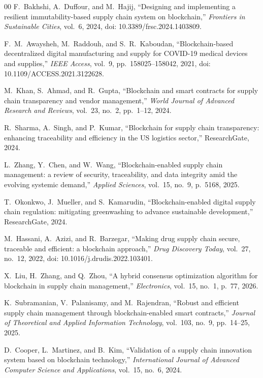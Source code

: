 \documentclass[conference]{IEEEtran}
\begin{document}
\begin{thebibliography}{00}
F.\ Bakhshi, A.\ Duffour, and M.\ Hajij, ``Designing and implementing a resilient immutability-based supply chain system on blockchain,'' \textit{Frontiers in Sustainable Cities}, vol.~6, 2024, doi: 10.3389/frsc.2024.1403809.

F.\ M.\ Awaysheh, M.\ Raddouh, and S.\ R.\ Kaboudan, ``Blockchain-based decentralized digital manufacturing and supply for COVID-19 medical devices and supplies,'' \textit{IEEE Access}, vol.~9, pp.~158025--158042, 2021, doi: 10.1109/ACCESS.2021.3122628.

M.\ Khan, S.\ Ahmad, and R.\ Gupta, ``Blockchain and smart contracts for supply chain transparency and vendor management,'' \textit{World Journal of Advanced Research and Reviews}, vol.~23, no.~2, pp.~1--12, 2024.

R.\ Sharma, A.\ Singh, and P.\ Kumar, ``Blockchain for supply chain transparency: enhancing traceability and efficiency in the US logistics sector,'' ResearchGate, 2024.

L.\ Zhang, Y.\ Chen, and W.\ Wang, ``Blockchain-enabled supply chain management: a review of security, traceability, and data integrity amid the evolving systemic demand,'' \textit{Applied Sciences}, vol.~15, no.~9, p.~5168, 2025.

T.\ Okonkwo, J.\ Mueller, and S.\ Kamarudin, ``Blockchain-enabled digital supply chain regulation: mitigating greenwashing to advance sustainable development,'' ResearchGate, 2024.

M.\ Hassani, A.\ Azizi, and R.\ Barzegar, ``Making drug supply chain secure, traceable and efficient: a blockchain approach,'' \textit{Drug Discovery Today}, vol.~27, no.~12, 2022, doi: 10.1016/j.drudis.2022.103401.

X.\ Liu, H.\ Zhang, and Q.\ Zhou, ``A hybrid consensus optimization algorithm for blockchain in supply chain management,'' \textit{Electronics}, vol.~15, no.~1, p.~77, 2026.

K.\ Subramanian, V.\ Palanisamy, and M.\ Rajendran, ``Robust and efficient supply chain management through blockchain-enabled smart contracts,'' \textit{Journal of Theoretical and Applied Information Technology}, vol.~103, no.~9, pp.~14--25, 2025.

D.\ Cooper, L.\ Martinez, and B.\ Kim, ``Validation of a supply chain innovation system based on blockchain technology,'' \textit{International Journal of Advanced Computer Science and Applications}, vol.~15, no.~6, 2024.


\end{thebibliography}
\end{document}
